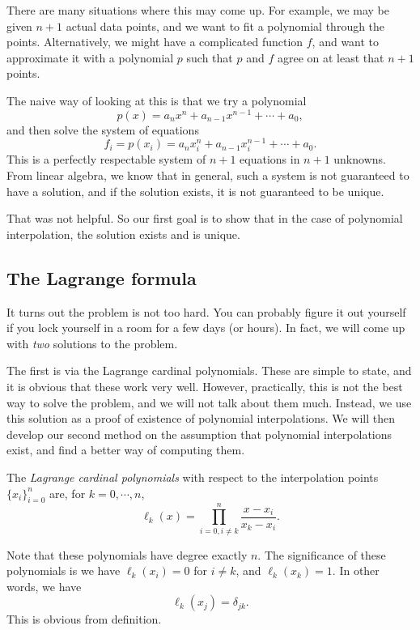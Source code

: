 \documentclass[a4paper]{article}
\begin{document}
There are many situations where this may come up. For example, we may be given $n + 1$ actual data points, and we want to fit a polynomial through the points. Alternatively, we might have a complicated function $f$, and want to approximate it with a polynomial $p$ such that $p$ and $f$ agree on at least that $n + 1$ points.

The naive way of looking at this is that we try a polynomial
\[
  p(x) = a_n x^n + a_{n - 1}x^{n - 1} + \cdots + a_0,
\]
and then solve the system of equations
\[
  f_i = p(x_i) = a_n x_i^n + a_{n - 1}x_i^{n - 1} + \cdots + a_0.
\]
This is a perfectly respectable system of $n + 1$ equations in $n + 1$ unknowns. From linear algebra, we know that in general, such a system is not guaranteed to have a solution, and if the solution exists, it is not guaranteed to be unique.

That was not helpful. So our first goal is to show that in the case of polynomial interpolation, the solution exists and is unique.

\subsection{The Lagrange formula}
It turns out the problem is not too hard. You can probably figure it out yourself if you lock yourself in a room for a few days (or hours). In fact, we will come up with \emph{two} solutions to the problem.

The first is via the Lagrange cardinal polynomials. These are simple to state, and it is obvious that these work very well. However, practically, this is not the best way to solve the problem, and we will not talk about them much. Instead, we use this solution as a proof of existence of polynomial interpolations. We will then develop our second method on the assumption that polynomial interpolations exist, and find a better way of computing them.

\begin{defi}
  The \emph{Lagrange cardinal polynomials} with respect to the interpolation points $\{x_i\}_{i = 0}^n$ are, for $k = 0, \cdots, n$,
  \[
    \ell_k (x) = \prod_{i = 0, i \not= k}^n \frac{x - x_i}{x_k - x_i}.
  \]
\end{defi}
Note that these polynomials have degree exactly $n$. The significance of these polynomials is we have $\ell_k(x_i) = 0$ for $i \not= k$, and $\ell_k(x_k) = 1$. In other words, we have
\[
  \ell_k(x_j) = \delta_{jk}.
\]
This is obvious from definition.
\end{document}
